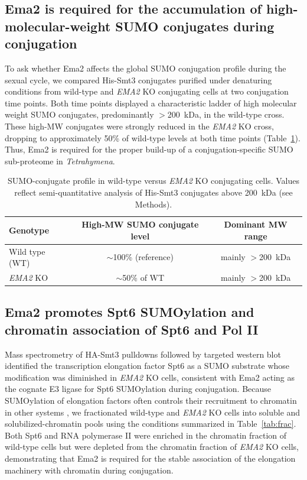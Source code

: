 \documentclass[11pt,a4paper]{article}
\begin{document}
\subsection{Ema2 is required for the accumulation of high-molecular-weight SUMO conjugates during conjugation}
To ask whether Ema2 affects the global SUMO conjugation profile during the sexual cycle, we compared His-Smt3 conjugates purified under denaturing conditions from wild-type and \textit{EMA2} KO conjugating cells at two conjugation time points. Both time points displayed a characteristic ladder of high molecular weight SUMO conjugates, predominantly $>$200~kDa, in the wild-type cross. These high-MW conjugates were strongly reduced in the \textit{EMA2} KO cross, dropping to approximately 50\% of wild-type levels at both time points (Table~\ref{tab:sumo}). Thus, Ema2 is required for the proper build-up of a conjugation-specific SUMO sub-proteome in \textit{Tetrahymena}.

\begin{table}[h]
\centering
\caption{SUMO-conjugate profile in wild-type versus \textit{EMA2} KO conjugating cells. Values reflect semi-quantitative analysis of His-Smt3 conjugates above 200~kDa (see Methods).}
\label{tab:sumo}
\begin{tabular}{lcc}
\toprule
Genotype & High-MW SUMO conjugate level & Dominant MW range \\
\midrule
Wild type (WT)   & $\sim$100\% (reference)        & mainly $>$200~kDa \\
\textit{EMA2} KO & $\sim$50\% of WT               & mainly $>$200~kDa \\
\bottomrule
\end{tabular}
\end{table}

\subsection{Ema2 promotes Spt6 SUMOylation and chromatin association of Spt6 and Pol II}
Mass spectrometry of HA-Smt3 pulldowns followed by targeted western blot identified the transcription elongation factor Spt6 as a SUMO substrate whose modification was diminished in \textit{EMA2} KO cells, consistent with Ema2 acting as the cognate E3 ligase for Spt6 SUMOylation during conjugation. Because SUMOylation of elongation factors often controls their recruitment to chromatin in other systems \citep{Hendriks2016,Geiss2007}, we fractionated wild-type and \textit{EMA2} KO cells into soluble and solubilized-chromatin pools using the conditions summarized in Table~\ref{tab:frac}. Both Spt6 and RNA polymerase II were enriched in the chromatin fraction of wild-type cells but were depleted from the chromatin fraction of \textit{EMA2} KO cells, demonstrating that Ema2 is required for the stable association of the elongation machinery with chromatin during conjugation.
\end{document}
